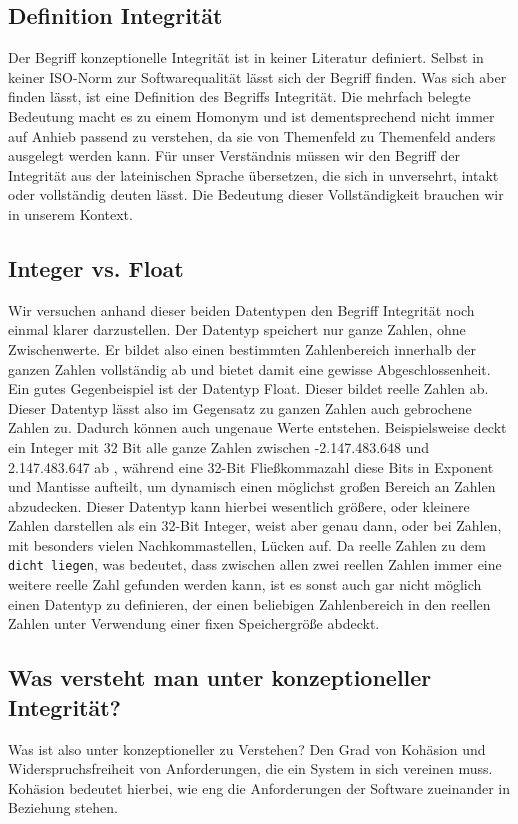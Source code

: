 \documentclass[a4paper, ngerman, 12pt, usenames, dvipsnames]{article}
\begin{document}
\subsection{Definition Integrität}
Der Begriff konzeptionelle Integrität ist in keiner Literatur definiert. Selbst in keiner ISO-Norm zur Softwarequalität lässt sich der Begriff finden. Was sich aber finden lässt, ist eine Definition des Begriffs Integrität. Die mehrfach belegte Bedeutung macht es zu einem Homonym und ist dementsprechend nicht immer auf Anhieb passend zu verstehen, da sie von Themenfeld zu Themenfeld anders ausgelegt werden kann. Für unser Verständnis müssen wir den Begriff der Integrität aus der lateinischen Sprache übersetzen, die sich in unversehrt, intakt oder vollständig deuten lässt. Die Bedeutung dieser Vollständigkeit brauchen wir in unserem Kontext. 
\subsection{Integer vs. Float}
Wir versuchen anhand dieser beiden Datentypen den Begriff Integrität noch einmal klarer darzustellen. Der Datentyp speichert nur ganze Zahlen, ohne Zwischenwerte. Er bildet also einen bestimmten Zahlenbereich innerhalb der ganzen Zahlen vollständig ab und bietet damit eine gewisse Abgeschlossenheit. Ein gutes Gegenbeispiel ist der Datentyp Float. Dieser bildet reelle Zahlen ab. Dieser Datentyp lässt also im Gegensatz zu ganzen Zahlen auch gebrochene Zahlen zu. Dadurch können auch ungenaue Werte entstehen. Beispielsweise deckt ein Integer mit 32 Bit alle ganze Zahlen zwischen -2.147.483.648 und 2.147.483.647 ab \cite{dewiki:integer}, während eine 32-Bit Fließkommazahl diese Bits in Exponent und Mantisse aufteilt, um dynamisch einen möglichst großen Bereich an Zahlen abzudecken. Dieser Datentyp kann hierbei wesentlich größere, oder kleinere Zahlen darstellen als ein 32-Bit Integer, weist aber genau dann, oder bei Zahlen, mit besonders vielen Nachkommastellen, Lücken auf. \cite{dewiki:float} Da reelle Zahlen zu dem \texttt{dicht liegen}, was bedeutet, dass zwischen allen zwei reellen Zahlen immer eine weitere reelle Zahl gefunden werden kann, ist es sonst auch gar nicht möglich einen Datentyp zu definieren, der einen beliebigen Zahlenbereich in den reellen Zahlen unter Verwendung einer fixen Speichergröße abdeckt. 

\subsection{Was versteht man unter konzeptioneller Integrität?}
Was ist also unter konzeptioneller zu Verstehen?
Den Grad von Kohäsion und Widerspruchsfreiheit von Anforderungen, die ein System in sich vereinen muss. Kohäsion bedeutet hierbei, wie eng die Anforderungen der Software zueinander in Beziehung stehen.
\end{document}
